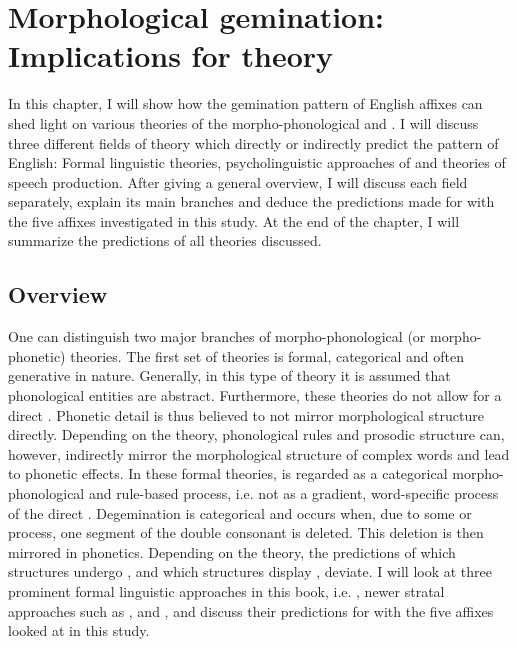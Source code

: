\chapter {Morphological gemination: Implications for theory} \label{Theory}

In this chapter, I will show how the {gemination} pattern of English affixes can shed light on various theories of the morpho-phonological and . I will discuss three different fields of theory which directly or indirectly predict the  pattern of English: Formal linguistic theories, psycholinguistic approaches of  and theories of speech production. After giving a general overview, I will discuss each field  separately, explain its main branches and deduce the predictions made for  with the five affixes investigated in this study.  At the end of the chapter, I will summarize the predictions of all theories discussed.\\


\section{Overview}
One can distinguish two major branches of morpho-phonological (or morpho-phonetic) theories. The first set of theories is formal, categorical and often generative in nature. Generally, in this type of theory it is assumed that phonological entities are abstract. Furthermore, these theories do not allow for a direct . Phonetic detail is thus believed to not mirror morphological structure directly. Depending on the theory, phonological rules and prosodic structure can, however, indirectly mirror the morphological structure of complex words and lead to phonetic effects. 
In these formal theories,  is regarded as a categorical morpho-phonological and rule-based process, i.e. not as a gradient, word-specific process of the direct . Degemination is categorical and occurs when, due to some  or process, one segment of the double consonant is deleted. This deletion is then mirrored in phonetics. Depending on the theory, the predictions of which structures undergo , and which structures display , deviate. I will look at three prominent formal linguistic approaches in this book, i.e. , newer stratal approaches such as , and ,  and discuss their predictions for  with the five affixes looked at in this study. 

